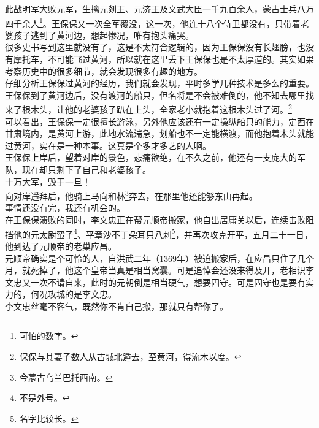 \begin{multicols}{\theparacolNo}
此战明军大败元军，生擒元剡王、元济王及文武大臣一千九百余人，蒙古士兵八万四千余人\footnote{可怕的数字。}。王保保又一次全军覆没，这一次，他连十八个侍卫都没有，只带着老婆孩子逃到了黄河边，想起惨况，唯有抱头痛哭。\\

很多史书写到这里就没有了，这是不太符合逻辑的，因为王保保没有长翅膀，也没有摩托车，不可能飞过黄河，所以就在这里丢下王保保也是不太厚道的。其实如果考察历史中的很多细节，就会发现很多有趣的地方。\\

仔细分析王保保过黄河的经历，我们就会发现，平时多学几种技术是多么的重要。\\

王保保到了黄河边后，没有渡河的船只，但名将是不会被难倒的，他不知去哪里找来了根木头，让他的老婆孩子趴在上头，全家老小就抱着这根木头过了河。\footnote{保保与其妻子数人从古城北遁去，至黄河，得流木以度。}\\

可以看出，王保保一定很擅长游泳，另外他应该还有一定操纵船只的能力，定西在甘肃境内，是黄河上游，此地水流湍急，划船也不一定能横渡，而他抱着木头就能过黄河，实在是一种本事。这真是个多才多艺的人啊。\\

王保保上岸后，望着对岸的景色，悲痛欲绝，在不久之前，他还有一支庞大的军队，现在却只剩下了自己和老婆孩子。\\

十万大军，毁于一旦！\\

向对岸遥拜后，他骑上马向和林\footnote{今蒙古乌兰巴托西南。}奔去，在那里他还能够东山再起。\\

事情还没有完，我还有机会的。\\

在王保保溃败的同时，李文忠正在帮元顺帝搬家，他自出居庸关以后，连续击败阻挡他的元太尉蛮子\footnote{不是外号。}、平章沙不丁朵耳只八刺\footnote{名字比较长。}，并再次攻克开平，五月二十一日，他到达了元顺帝的老巢应昌。\\

元顺帝确实是个可怜的人，自洪武二年（1369年）被迫搬家后，在应昌只住了几个月，就死掉了，他这个皇帝当真是相当窝囊。可是追悼会还没来得及开，老相识李文忠又一次不请自来，此时的元朝倒是相当硬气，想要固守。可是固守也是要有实力的，何况攻城的是李文忠。\\

李文忠丝毫不客气，既然你不肯自己搬，那就只有帮你了。\\


\end{multicols}
